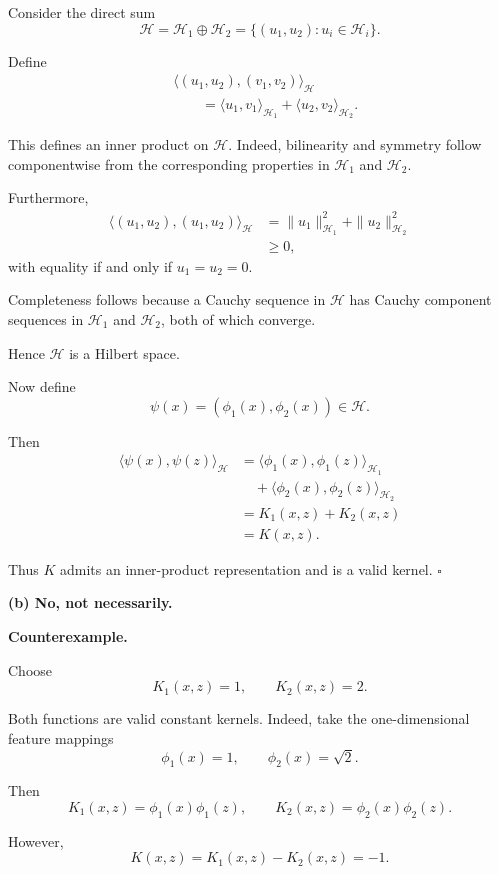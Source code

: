 \documentclass[11pt]{article}
\begin{document}
Consider the direct sum
\[
\mathcal H=\mathcal H_1\oplus\mathcal H_2
=
\{(u_1,u_2):u_i\in\mathcal H_i\}.
\]

Define
\[
\begin{aligned}
&\langle(u_1,u_2),(v_1,v_2)\rangle_{\mathcal H}\\
&\qquad=
\langle u_1,v_1\rangle_{\mathcal H_1}
+
\langle u_2,v_2\rangle_{\mathcal H_2}.
\end{aligned}
\]

This defines an inner product on $\mathcal H$.
Indeed, bilinearity and symmetry follow componentwise
from the corresponding properties in $\mathcal H_1$
and $\mathcal H_2$.

Furthermore,
\[
\begin{aligned}
\langle(u_1,u_2),(u_1,u_2)\rangle_{\mathcal H}
&=\|u_1\|_{\mathcal H_1}^2
+\|u_2\|_{\mathcal H_2}^2\\
&\geq0,
\end{aligned}
\]
with equality if and only if $u_1=u_2=0$.

Completeness follows because a Cauchy sequence
in $\mathcal H$ has Cauchy component sequences
in $\mathcal H_1$ and $\mathcal H_2$, both of
which converge.

Hence $\mathcal H$ is a Hilbert space.

Now define
\[
\psi(x)=(\phi_1(x),\phi_2(x))\in\mathcal H.
\]

Then
\[
\begin{aligned}
\langle\psi(x),\psi(z)\rangle_{\mathcal H}
&=
\langle\phi_1(x),\phi_1(z)\rangle_{\mathcal H_1}\\
&\quad+
\langle\phi_2(x),\phi_2(z)\rangle_{\mathcal H_2}\\
&=K_1(x,z)+K_2(x,z)\\
&=K(x,z).
\end{aligned}
\]

Thus $K$ admits an inner-product representation
and is a valid kernel.
\hfill$\square$

\bigskip
\noindent\textbf{(b) No, not necessarily.}

\textbf{Counterexample.}

Choose
\[
K_1(x,z)=1,
\qquad
K_2(x,z)=2.
\]

Both functions are valid constant kernels.
Indeed, take the one-dimensional feature mappings
\[
\phi_1(x)=1,
\qquad
\phi_2(x)=\sqrt{2}.
\]

Then
\[
K_1(x,z)=\phi_1(x)\phi_1(z),
\qquad
K_2(x,z)=\phi_2(x)\phi_2(z).
\]

However,
\[
K(x,z)=K_1(x,z)-K_2(x,z)=-1.
\]
\end{document}
